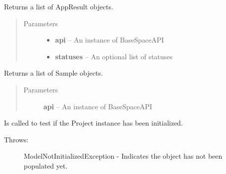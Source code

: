 \documentclass[letterpaper,10pt,english]{sphinxmanual}
\begin{document}
\begin{fulllineitems}
\begin{fulllineitems}
\begin{quote}
\begin{description}
\end{description}\end{quote}

\end{fulllineitems}


\begin{fulllineitems}
\label{Available modules:BaseSpacePy.model.Project.Project.getAppResults}
Returns a list of AppResult objects.
\begin{quote}\begin{description}
\item[{Parameters}] \leavevmode\begin{itemize}
\item {} 
\textbf{api} -- An instance of BaseSpaceAPI

\item {} 
\textbf{statuses} -- An optional list of statuses

\end{itemize}

\end{description}\end{quote}

\end{fulllineitems}


\begin{fulllineitems}
\label{Available modules:BaseSpacePy.model.Project.Project.getSamples}
Returns a list of Sample objects.
\begin{quote}\begin{description}
\item[{Parameters}] \leavevmode
\textbf{api} -- An instance of BaseSpaceAPI

\end{description}\end{quote}

\end{fulllineitems}


\begin{fulllineitems}
\label{Available modules:BaseSpacePy.model.Project.Project.isInit}
Is called to test if the Project instance has been initialized.
\begin{description}
\item[{Throws:}] \leavevmode
ModelNotInitializedException - Indicates the object has not been populated yet.

\end{description}

\end{fulllineitems}


\end{fulllineitems}
\end{document}
